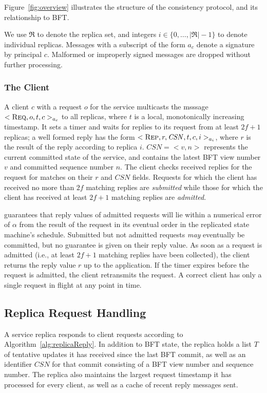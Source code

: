 \documentclass[twocolumn,10pt]{article}
\begin{document}
{Figure~\ref{fig:overview} illustrates the structure of the consistency
protocol, and its relationship to BFT.

We use $\Re$ to denote the replica set, and integers $i \in \{0, \ldots,
|\Re|-1\}$ to denote individual replicas. Messages with a subscript of
the form $a_c$ denote a signature by principal $c$.  Malformed or
improperly signed messages are dropped without further processing.


\subsubsection{The Client}
A client $c$ with a request $o$ for the service multicasts the msssage
$<\textsc{Req}, o, t, c>_{a_c}$ to all replicas, where $t$ is a local,
monotonically increasing timestamp.  It sets a timer and waits for replies to
its request from at least $2f+1$ replicas; a well formed reply has the
form $<\textsc{Rep}, r, \mathit{CSN}, t, c, i>_{a_i}$, where $r$ is the
result of the reply according to replica $i$.  $\mathit{CSN} = <v,n>$
represents the current committed state of the service, and contains the
latest BFT view number $v$ and committed sequence number $n$.  The client
checks received replies for the request for matches on their $r$ and
$\mathit{CSN}$ fields.  Requests for
which the client has received no more than $2f$ matching replies are
\emph{submitted} while those for which the client has received at least
$2f+1$ matching replies are \emph{admitted}.

\Sys guarantees that reply values of admitted requests will lie within a
numerical error of $\alpha$ from the result of the request in its
eventual order in the replicated state machine's schedule.  Submitted
but not admitted requests \emph{may} eventually be committed, but no
guarantee is given on their reply value.  As soon as a request is
admitted (i.e., at least $2f+1$ matching replies have been collected),
the client returns the reply value $r$ up to the application.  If the
timer expires before the request is admitted, the client retransmits the
request.  A correct client has only a single request in flight at any
point in time.






\subsection{Replica Request Handling}

A service replica responds to client requests according to
Algorithm~\ref{alg:replicaReply}.  In addition to BFT state, the replica
holds a list $T$ of tentative updates it has received since the last BFT
commit, as well as an identifier $\mathit{CSN}$ for that commit
consisting of a BFT view number and sequence number. The replica also 
maintains the largest request timestamp it has processed for every
client, as well as a cache of recent reply messages sent.

}
\end{document}
